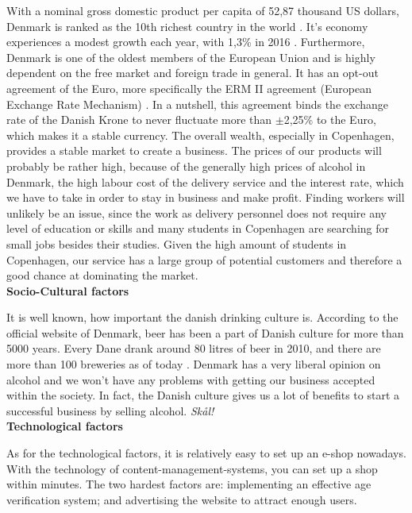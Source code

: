 \documentclass[12p]{article}
\begin{document}
With a nominal gross domestic product per capita of 52,87 thousand US dollars, Denmark is ranked as the 10th richest country in the world \cite{PEST_NominalGDPPerCapita}. It's economy experiences a modest growth each year, with 1,3\% in 2016 \cite{PEST_CIAFactbookDenmark}. Furthermore, Denmark is one of the oldest members of the European Union and is highly dependent on the free market and foreign trade in general. It has an opt-out agreement of the Euro, more specifically the ERM II agreement (European Exchange Rate Mechanism) \cite{PEST_ERM2}. In a nutshell, this agreement binds the exchange rate of the Danish Krone to never fluctuate more than $\pm$2,25\% to the Euro, which makes it a stable currency. The overall wealth, especially in Copenhagen, provides a stable market to create a business. The prices of our products will probably be rather high, because of the generally high prices of alcohol in Denmark, the high labour cost of the delivery service and the interest rate, which we have to take in order to stay in business and make profit. Finding workers will unlikely be an issue, since the work as delivery personnel does not require any level of education or skills and many students in Copenhagen are searching for small jobs besides their studies. Given the high amount of students in Copenhagen, our service has a large group of potential customers and therefore a good chance at dominating the market. \\

\textbf{Socio-Cultural factors}

It is well known, how important the danish drinking culture is. According to the official website of Denmark, beer has been a part of Danish culture for more than 5000 years. Every Dane drank around 80 litres of beer in 2010, and there are more than 100 breweries as of today \cite{PEST_BeerInDenmark}. Denmark has a very liberal opinion on alcohol and we won't have any problems with getting our business accepted within the society. In fact, the Danish culture gives us a lot of benefits to start a successful business by selling alcohol. \emph{Skål!} \\

\textbf{Technological factors}

As for the technological factors, it is relatively easy to set up an e-shop nowadays. With the technology of content-management-systems, you can set up a shop within minutes. The two hardest factors are: implementing an effective age verification system; and advertising the website to attract enough users.
\end{document}
